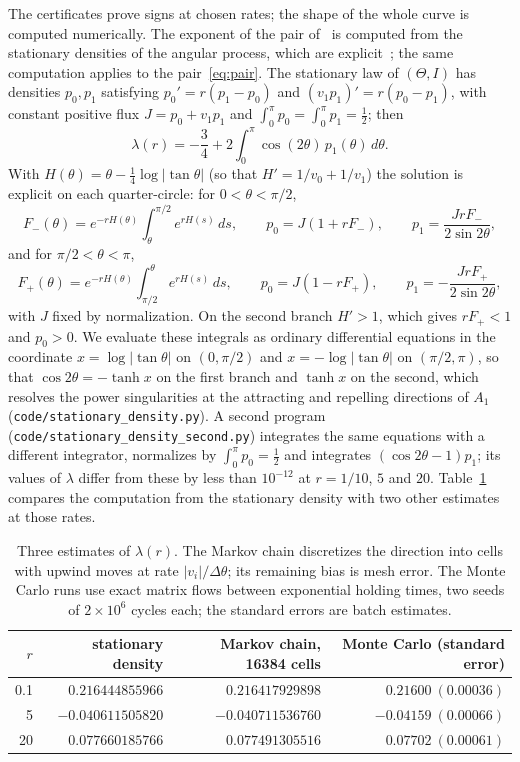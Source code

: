 \documentclass[11pt]{amsart}
\newcommand{\file}[1]{\nolinkurl{#1}}
\begin{document}
The certificates prove signs at chosen rates; the shape of the whole curve is computed numerically. The exponent of the
pair of~\cite{LMR14} is computed from the stationary densities of the angular process, which are
explicit~\cite[Theorem~4.1]{Mal15}; the same computation applies to the pair~\eqref{eq:pair}. The stationary law
of $(\Theta,I)$ has densities $p_0,p_1$ satisfying $p_0'=r(p_1-p_0)$ and $(v_1p_1)'=r(p_0-p_1)$, with constant positive
flux $J=p_0+v_1p_1$ and $\int_0^\pi p_0=\int_0^\pi p_1=\frac12$; then
\[
\lambda(r)=-\frac34+2\int_0^\pi\cos(2\theta)\,p_1(\theta)\,d\theta .
\]
With $H(\theta)=\theta-\frac14\log|\tan\theta|$ (so that $H'=1/v_0+1/v_1$) the solution is explicit on each
quarter-circle: for $0<\theta<\pi/2$,
\[
F_-(\theta)=e^{-rH(\theta)}\int_\theta^{\pi/2}e^{rH(s)}\,ds,\qquad p_0=J(1+rF_-),\qquad p_1=\frac{JrF_-}{2\sin2\theta},
\]
and for $\pi/2<\theta<\pi$,
\[
F_+(\theta)=e^{-rH(\theta)}\int_{\pi/2}^\theta e^{rH(s)}\,ds,\qquad p_0=J(1-rF_+),\qquad p_1=-\frac{JrF_+}{2\sin2\theta},
\]
with $J$ fixed by normalization. On the second branch $H'>1$, which gives $rF_+<1$ and $p_0>0$. We evaluate these
integrals as ordinary differential equations in the coordinate $x=\log|\tan\theta|$ on $(0,\pi/2)$ and
$x=-\log|\tan\theta|$ on $(\pi/2,\pi)$, so that $\cos2\theta=-\tanh x$ on the first branch and $\tanh x$ on the second,
which resolves the power singularities at the attracting and repelling directions of $A_1$
(\file{code/stationary_density.py}). A second program (\file{code/stationary_density_second.py}) integrates the same
equations with a different integrator, normalizes by $\int_0^\pi p_0=\frac12$ and integrates $(\cos2\theta-1)p_1$; its
values of $\lambda$ differ from these by less than $10^{-12}$ at $r=1/10$, $5$ and $20$.
Table~\ref{tab:num} compares the computation from the stationary density with two other estimates at those rates.

\begin{table}[ht]
\centering
\begin{tabular}{@{}rrrr@{}}
\toprule
$r$ & stationary density & Markov chain, 16384 cells & Monte Carlo (standard error)\\
\midrule
0.1 & $0.216444855966$ & $0.216417929898$ & $0.21600\ (0.00036)$\\
5 & $-0.040611505820$ & $-0.040711536760$ & $-0.04159\ (0.00066)$\\
20 & $0.077660185766$ & $0.077491305516$ & $0.07702\ (0.00061)$\\
\bottomrule
\end{tabular}
\caption{Three estimates of $\lambda(r)$. The Markov chain discretizes the direction into cells with upwind moves at rate
$|v_i|/\Delta\theta$; its remaining bias is mesh error. The Monte Carlo runs use exact matrix flows between
exponential holding times, two seeds of $2\times10^6$ cycles each; the standard errors are batch estimates.}\label{tab:num}
\end{table}
\end{document}
